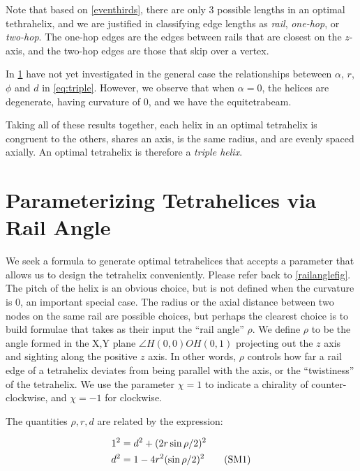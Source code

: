 \documentclass[review]{siamonline1116}
\newcommand\numberthis{\addtocounter{equation}{1}\tag{\theequation}}
\begin{document}
 Note that based on \cref{eventhirds}, there are only 3 possible lengths in an optimal tethrahelix,
 and we are justified in classifying edge lengths as \emph{rail}, \emph{one-hop}, or
\emph{two-hop}. The one-hop edges are the edges between rails that are closest on the $z$-axis, and the two-hop edges are those that skip over a vertex.

In \cref{sec:parameterizing} have not yet investigated in the general case the relationships beteween
$\alpha$, $r$, $\phi$ and $d$ in \cref{eq:triple}.
However, we observe that when $\alpha = 0$, the helices are degenerate, having curvature of $0$, and
we have the equitetrabeam.

Taking all of these results together, 
each helix in an optimal tetrahelix is congruent to the others, shares an axis, is the same radius, and are evenly spaced
axially.
An optimal tetrahelix is therefore a \emph{triple helix}.

\section{Parameterizing Tetrahelices via Rail Angle}
\label{sec:parameterizing}

We seek a formula to generate optimal tetrahelices that accepts a
parameter that allows us to design the tetrahelix conveniently.
Please refer back to \cref{railanglefig}.
The pitch of the helix is an obvious choice, but is not defined when the
curvature is $0$, an important special case. The radius or the axial
distance between two nodes on the same rail are possible choices, but
perhaps the clearest choice is to build formulae that takes as their
input the ``rail angle'' $\rho$. We define $\rho$ to be the angle
formed in the X,Y plane $\angle H(0,0) O H(0,1)$ projecting out the $z$
axis and sighting along the positive $z$ axis. In other words, $\rho$
controls how far a rail edge of a tetrahelix deviates from being
parallel with the axis, or the ``twistiness'' of the tetrahelix. We use
the parameter $\chi = 1$ to indicate a chirality of counter-clockwise,
and $\chi = -1$ for clockwise.

The quantities $\rho,r,d$ are related by the expression:

\begin{align*}
  1^2 &= d^2 + (2 r \sin{ \rho / 2})^2 \\
  d^2 &= 1 - 4 r^2 (\sin{ \rho / 2})^2    \numberthis  \label{railangle} \\
\end{align*}
\end{document}
